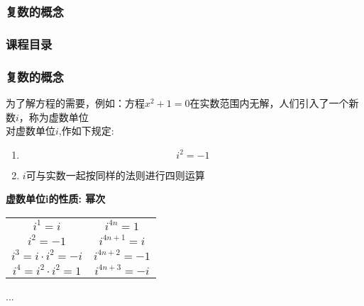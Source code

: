 \documentclass{beamer}
\begin{document}
\subsubsection{复数的概念}
\begin{frame}[t]
\frametitle{课程目录}
\tableofcontents[currentsubsection ] %
\end{frame}




\begin{frame}[t]
\frametitle{复数的概念}

为了解方程的需要，例如：方程$x^2+1=0$在实数范围内无解，人们引入了一个新数${i}$，称为虚数单位\\

对虚数单位$i$,作如下规定:

\begin{enumerate}[(1)]
    \item 
    $$ i^2 = -1$$
    \item
    $i$可与实数一起按同样的法则进行四则运算
\end{enumerate}
\textbf{虚数单位i的性质:  幂次}
\begin{table}
\begin{tabular}{c c}

 $ i^1 = i$   & $i^{4n} = 1$ \\ 
 $ i^2 = -1 $  & $  i^{4n+1} = i$ \\
 $ i^3 = i \cdot i^2 = -i$  & $ i^{4n+2} = -1$  \\
 $ i^4 = i^2 \cdot i^2 = 1$ & $ i^{4n+3} = -i$
  
\end{tabular}
\end{table}
...
\end{frame}
\end{document}
